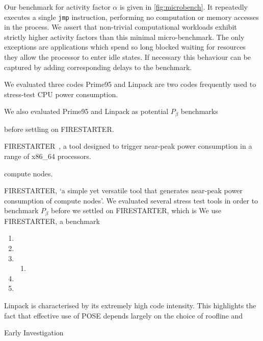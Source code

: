 Our benchmark for activity factor $\alpha$ is given in \autoref{fig:microbench}.
It repeatedly executes a single \texttt{jmp} instruction, performing no computation or memory accesses in the process.
We assert that non-trivial computational workloads exhibit strictly higher activity factors than this minimal micro-benchmark.
The only exceptions are applications which spend so long blocked waiting for resources they allow the processor to enter idle states.
If necessary this behaviour can be captured by adding corresponding delays to the benchmark.

We evaluated three codes
Prime95 and Linpack are two codes frequently used to stress-test CPU power consumption.

We also evaluated Prime95 and Linpack as potential $P_{\beta}$ benchmarks


before settling on FIRESTARTER.

FIRESTARTER~\cite{hackenberg:2013ab}, a tool designed to trigger near-peak power consumption in a range of x86\_64 processors.

compute nodes.

FIRESTARTER, `a simple yet versatile tool that generates near-peak power consumption of compute nodes'.
We evaluated several stress test tools in order to benchmark $P_{\beta}$ before we settled on
FIRESTARTER, which is 
We use FIRESTARTER, a benchmark

\begin{enumerate}
  \item {}
  \item {}
  \item {}
  \begin{enumerate}
    \item {}
  \end{enumerate}
  \item {}
  \item {}
\end{enumerate}



Linpack is characterised by its extremely high code intensity. 
This highlights the fact that effective use of POSE depends largely on the choice of roofline and 


\begin{table}
\centering
\caption{Early Investigation}

\end{table} 




